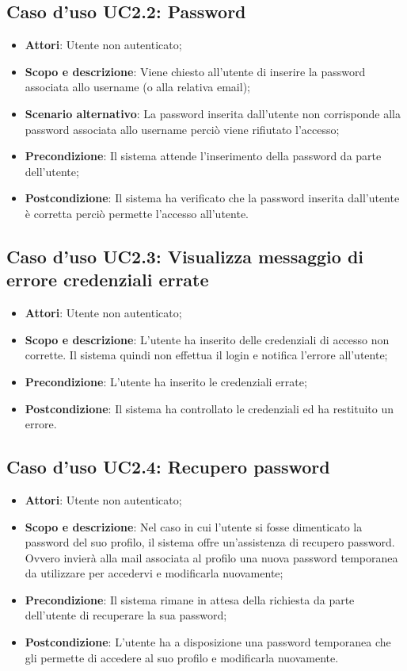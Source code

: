 \documentclass[12pt,a4paper,titlepage]{article}
\begin{document}
	\subsection{Caso d'uso UC2.2: Password}
	\label{UC2.2}
	\begin{itemize}
		\item \textbf{Attori}: Utente non autenticato;
		\item \textbf{Scopo e descrizione}: Viene chiesto all'utente di inserire la password associata allo username (o alla relativa email);
		\item \textbf{Scenario alternativo}: La password inserita dall'utente non corrisponde alla password associata allo username perciò viene rifiutato l'accesso;
		\item \textbf{Precondizione}: Il sistema attende l'inserimento della password da parte dell'utente;
		\item \textbf{Postcondizione}: Il sistema ha verificato che la password inserita dall'utente è corretta perciò permette l'accesso all'utente.
	\end{itemize}

	\subsection{Caso d'uso UC2.3: Visualizza messaggio di errore credenziali errate}
	\label{UC2.3}
	\begin{itemize}
		\item \textbf{Attori}: Utente non autenticato;
		\item \textbf{Scopo e descrizione}: L'utente ha inserito delle credenziali di accesso non corrette. Il sistema quindi non effettua il login e notifica l'errore all'utente;
		\item \textbf{Precondizione}: L'utente ha inserito le credenziali errate;
		\item \textbf{Postcondizione}: Il sistema ha controllato le credenziali ed ha restituito un errore.
	\end{itemize}

	\subsection{Caso d'uso UC2.4: Recupero password}
	\label{UC2.4}
	\begin{itemize}
		\item \textbf{Attori}: Utente non autenticato;
		\item \textbf{Scopo e descrizione}: Nel caso in cui l'utente si fosse dimenticato la password del suo profilo, il sistema offre un'assistenza di recupero password. Ovvero invierà alla mail associata al profilo una nuova password temporanea da utilizzare per accedervi e modificarla nuovamente;
		\item \textbf{Precondizione}: Il sistema rimane in attesa della richiesta da parte dell'utente di recuperare la sua password;
		\item \textbf{Postcondizione}: L'utente ha a disposizione una password temporanea che gli permette di accedere al suo profilo e modificarla nuovamente.
	\end{itemize}
\end{document}
